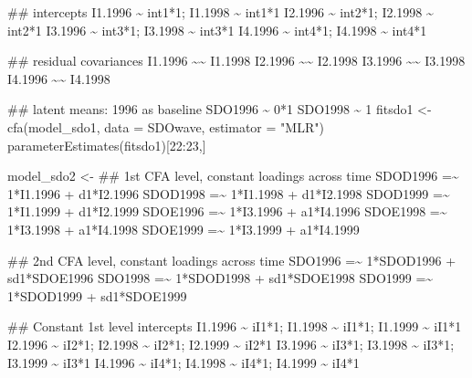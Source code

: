 \documentclass[
]{book}
\newenvironment{Shaded}{\begin{snugshade}}{\end{snugshade}}
\newcommand{\AttributeTok}[1]{\textcolor[rgb]{0.77,0.63,0.00}{#1}}
\newcommand{\DecValTok}[1]{\textcolor[rgb]{0.00,0.00,0.81}{#1}}
\newcommand{\FunctionTok}[1]{\textcolor[rgb]{0.00,0.00,0.00}{#1}}
\newcommand{\NormalTok}[1]{#1}
\newcommand{\OtherTok}[1]{\textcolor[rgb]{0.56,0.35,0.01}{#1}}
\newcommand{\SpecialCharTok}[1]{\textcolor[rgb]{0.00,0.00,0.00}{#1}}
\newcommand{\StringTok}[1]{\textcolor[rgb]{0.31,0.60,0.02}{#1}}
\begin{document}
\begin{Shaded}
\begin{Highlighting}[]
\StringTok{  \#\# intercepts}
\StringTok{  I1.1996 \textasciitilde{} int1*1; I1.1998 \textasciitilde{} int1*1}
\StringTok{  I2.1996 \textasciitilde{} int2*1; I2.1998 \textasciitilde{} int2*1 }
\StringTok{  I3.1996 \textasciitilde{} int3*1; I3.1998 \textasciitilde{} int3*1}
\StringTok{  I4.1996 \textasciitilde{} int4*1; I4.1998 \textasciitilde{} int4*1}

\StringTok{  \#\# residual covariances}
\StringTok{  I1.1996 \textasciitilde{}\textasciitilde{} I1.1998}
\StringTok{  I2.1996 \textasciitilde{}\textasciitilde{} I2.1998}
\StringTok{  I3.1996 \textasciitilde{}\textasciitilde{} I3.1998}
\StringTok{  I4.1996 \textasciitilde{}\textasciitilde{} I4.1998}

\StringTok{  \#\# latent means: 1996 as baseline}
\StringTok{  SDO1996 \textasciitilde{} 0*1}
\StringTok{  SDO1998 \textasciitilde{} 1\textquotesingle{}}
\NormalTok{fitsdo1 }\OtherTok{\textless{}{-}} \FunctionTok{cfa}\NormalTok{(model\_sdo1, }\AttributeTok{data =}\NormalTok{ SDOwave, }\AttributeTok{estimator =} \StringTok{"MLR"}\NormalTok{)}
\FunctionTok{parameterEstimates}\NormalTok{(fitsdo1)[}\DecValTok{22}\SpecialCharTok{:}\DecValTok{23}\NormalTok{,]}

\NormalTok{model\_sdo2 }\OtherTok{\textless{}{-}} \StringTok{\textquotesingle{}}
\StringTok{  \#\# 1st CFA level, constant loadings across time}
\StringTok{  SDOD1996 =\textasciitilde{} 1*I1.1996 + d1*I2.1996}
\StringTok{  SDOD1998 =\textasciitilde{} 1*I1.1998 + d1*I2.1998}
\StringTok{  SDOD1999 =\textasciitilde{} 1*I1.1999 + d1*I2.1999 }
\StringTok{  SDOE1996 =\textasciitilde{} 1*I3.1996 + a1*I4.1996 }
\StringTok{  SDOE1998 =\textasciitilde{} 1*I3.1998 + a1*I4.1998}
\StringTok{  SDOE1999 =\textasciitilde{} 1*I3.1999 + a1*I4.1999}

\StringTok{  \#\# 2nd CFA level, constant loadings across time}
\StringTok{  SDO1996 =\textasciitilde{} 1*SDOD1996 + sd1*SDOE1996}
\StringTok{  SDO1998 =\textasciitilde{} 1*SDOD1998 + sd1*SDOE1998}
\StringTok{  SDO1999 =\textasciitilde{} 1*SDOD1999 + sd1*SDOE1999}

\StringTok{  \#\# Constant 1st level intercepts}
\StringTok{  I1.1996 \textasciitilde{} iI1*1; I1.1998 \textasciitilde{} iI1*1; I1.1999 \textasciitilde{} iI1*1}
\StringTok{  I2.1996 \textasciitilde{} iI2*1; I2.1998 \textasciitilde{} iI2*1; I2.1999 \textasciitilde{} iI2*1}
\StringTok{  I3.1996 \textasciitilde{} iI3*1; I3.1998 \textasciitilde{} iI3*1; I3.1999 \textasciitilde{} iI3*1}
\StringTok{  I4.1996 \textasciitilde{} iI4*1; I4.1998 \textasciitilde{} iI4*1; I4.1999 \textasciitilde{} iI4*1}


\end{Highlighting}
\end{Shaded}
\end{document}
